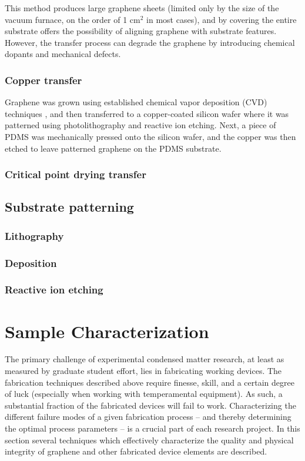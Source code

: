 \documentclass[edeposit,fullpage,draftthesis]{uiucthesis2009}
\begin{document}
        
        This method produces large graphene
        sheets (limited only by the size of the vacuum furnace, on the order of
        1 cm$^2$ in most cases), and by covering the entire substrate offers
        the possibility of aligning graphene with substrate features. However,
        the transfer process can degrade the graphene by introducing chemical
        dopants and mechanical defects.
        
            
            \subsubsection{Copper transfer}
            Graphene was grown using established chemical vapor deposition (CVD) techniques \cite{Li2009}, and then transferred to a copper-coated silicon wafer where it was patterned using photolithography and reactive ion etching. Next, a piece of PDMS was mechanically pressed onto the silicon wafer, and the copper was then etched to leave patterned graphene on the PDMS substrate\cite{Lee2010}.
            
            \subsubsection{Critical point drying transfer}
            
            
        \subsection{Substrate patterning}
            \subsubsection{Lithography}
            \subsubsection{Deposition}
            \subsubsection{Reactive ion etching}
    
    \section{Sample Characterization}
    The primary challenge of experimental condensed matter research, at least as measured by graduate student effort, lies in fabricating working devices. The fabrication techniques described above require finesse, skill, and a certain degree of luck (especially when working with temperamental equipment). As such, a substantial fraction of the fabricated devices will fail to work. Characterizing the different failure modes of a given fabrication process -- and thereby determining the optimal process parameters -- is a crucial part of each research project. In this section several techniques which effectively characterize the quality and physical integrity of graphene and other fabricated device elements are described.
    
\end{document}
